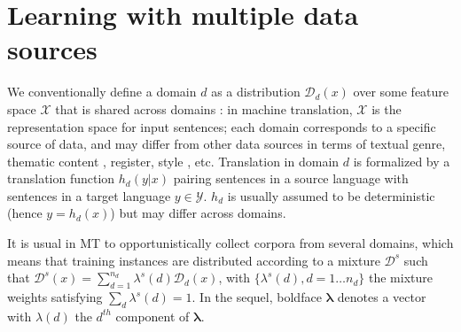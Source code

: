 \documentclass[11pt]{article}
\newcommand{\vlambda}{\ensuremath{\boldsymbol\lambda}\xspace} %
\begin{document}
\section{Learning with multiple data sources} \label{sec:mdmt}

We conventionally define a domain $d$ as a distribution $\mathcal{D}_d(x)$ over some feature space $\mathcal{X}$ that is shared across domains \cite{Pan10asurvey}: in machine translation, $\mathcal{X}$ is the representation space for input sentences; each domain corresponds to a specific source of data, and may differ from other data sources in terms of textual genre, thematic content \cite{Chen16guided}, register, style \cite{Niu18multitask}, etc. Translation in domain $d$ is formalized by a translation function $h_d(y|x)$ pairing sentences in a source language with sentences in a target language $y \in \mathcal{Y}$. $h_d$ is usually assumed to be deterministic (hence $y = h_d(x)$) but may differ across domains.

It is usual in MT to opportunistically collect corpora from several domains, which means that training instances are distributed according to a mixture $\mathcal{D}^s$ such that $\mathcal{D}^s(x) = \sum_{d=1}^{n_d} \lambda^{s}(d) \mathcal{D}_d(x)$, with $\{\lambda^{s}(d), d=1 \dots n_d\}$ the mixture weights satisfying $\sum_d \lambda^{s}(d)=1$. In the sequel, boldface $\vlambda$ denotes a vector with $\lambda(d)$ the $d^{th}$ component of $\vlambda$.
\end{document}
